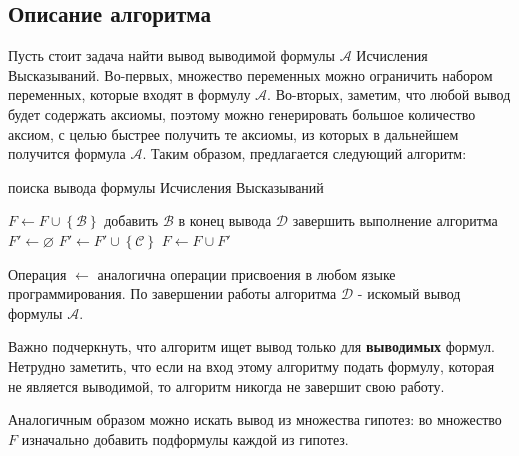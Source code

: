 \documentclass[a4paper,12pt]{article}
\renewcommand{\emptyset}{\varnothing}
\theoremstyle{definition}
\begin{document}
	\subsection{Описание алгоритма}
	Пусть стоит задача найти вывод выводимой формулы $ \mathcal{A} $ Исчисления Высказываний.
	Во-первых, множество переменных можно ограничить набором переменных, которые входят в формулу $ \mathcal{A} $. Во-вторых, заметим, что любой вывод будет содержать аксиомы, поэтому можно генерировать большое количество аксиом, с целью быстрее получить те аксиомы, из которых в дальнейшем получится формула $ \mathcal{A} $. Таким образом, предлагается следующий алгоритм: 
	
	\begin{algorithm}
		\caption{поиска вывода формулы Исчисления Высказываний}\label{alg1}
		\begin{algorithmic}[1]
			\State $ F \gets F \cup \left\lbrace \mathcal{B} \right\rbrace  $
			\EndFor
			\State добавить $\mathcal{B}$ в конец вывода $\mathcal{D}$
			\State завершить выполнение алгоритма
			\EndIf
			\EndIf
			\EndFor
			\State $ F' \gets \emptyset $
			\State $ F' \gets F' \cup \left\lbrace \mathcal{C} \right\rbrace  $
			\EndFor
			\EndFor
			\EndFor
			\State $ F \gets F \cup F' $
			\EndWhile		
		\end{algorithmic}
	\end{algorithm}
	Операция $ \gets $ аналогична операции присвоения в любом языке программирования. По завершении работы алгоритма $\mathcal{D}$ - искомый вывод формулы $ \mathcal{A} $. 
	
	
	Важно подчеркнуть, что алгоритм ищет вывод только для \textbf{выводимых} формул. Нетрудно заметить, что если на вход этому алгоритму подать формулу, которая не является выводимой, то алгоритм никогда не завершит свою работу.
	
	Аналогичным образом можно искать вывод из множества гипотез: во множество $F$ изначально добавить подформулы каждой из гипотез.
	
\end{document}
